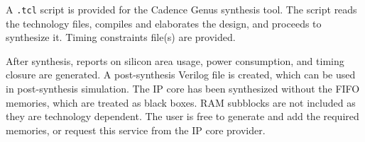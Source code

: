 %

A {\tt .tcl} script is provided for the Cadence Genus synthesis tool. The script
reads the technology files, compiles and elaborates the design, and proceeds to
synthesize it. Timing constraints file(s) are provided.

After synthesis, reports on silicon area usage, power consumption, and timing
closure are generated. A post-synthesis Verilog file is created, which can be
used in post-synthesis simulation. The IP core has been synthesized without the
FIFO memories, which are treated as black boxes. RAM subblocks are not included as
they are technology dependent. The user is free to generate and add the required
memories, or request this service from the IP core provider.
